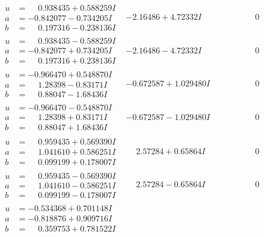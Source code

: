 \documentclass[1p]{elsarticle_modified}
\theoremstyle{definition}
\begin{document}
$$\begin{array}{c|c|c}
\begin{aligned}
u &= \phantom{-}0.938435 + 0.588259 I \\
a &= -0.842077 - 0.734205 I \\
b &= \phantom{-}0.197316 - 0.238136 I\end{aligned}
 & -2.16486 + 4.72332 I & \phantom{-0.000000 } 0 \\ \hline\begin{aligned}
u &= \phantom{-}0.938435 - 0.588259 I \\
a &= -0.842077 + 0.734205 I \\
b &= \phantom{-}0.197316 + 0.238136 I\end{aligned}
 & -2.16486 - 4.72332 I & \phantom{-0.000000 } 0 \\ \hline\begin{aligned}
u &= -0.966470 + 0.548870 I \\
a &= \phantom{-}1.28398 - 0.83171 I \\
b &= \phantom{-}0.88047 - 1.68436 I\end{aligned}
 & -0.672587 + 1.029480 I & \phantom{-0.000000 } 0 \\ \hline\begin{aligned}
u &= -0.966470 - 0.548870 I \\
a &= \phantom{-}1.28398 + 0.83171 I \\
b &= \phantom{-}0.88047 + 1.68436 I\end{aligned}
 & -0.672587 - 1.029480 I & \phantom{-0.000000 } 0 \\ \hline\begin{aligned}
u &= \phantom{-}0.959435 + 0.569390 I \\
a &= \phantom{-}1.041610 + 0.586251 I \\
b &= \phantom{-}0.099199 + 0.178007 I\end{aligned}
 & \phantom{-}2.57284 + 0.65864 I & \phantom{-0.000000 } 0 \\ \hline\begin{aligned}
u &= \phantom{-}0.959435 - 0.569390 I \\
a &= \phantom{-}1.041610 - 0.586251 I \\
b &= \phantom{-}0.099199 - 0.178007 I\end{aligned}
 & \phantom{-}2.57284 - 0.65864 I & \phantom{-0.000000 } 0 \\ \hline\begin{aligned}
u &= -0.534368 + 0.701148 I \\
a &= -0.818876 + 0.909716 I \\
b &= \phantom{-}0.359753 + 0.781522 I\end{aligned}

\end{array}$$
\end{document}
